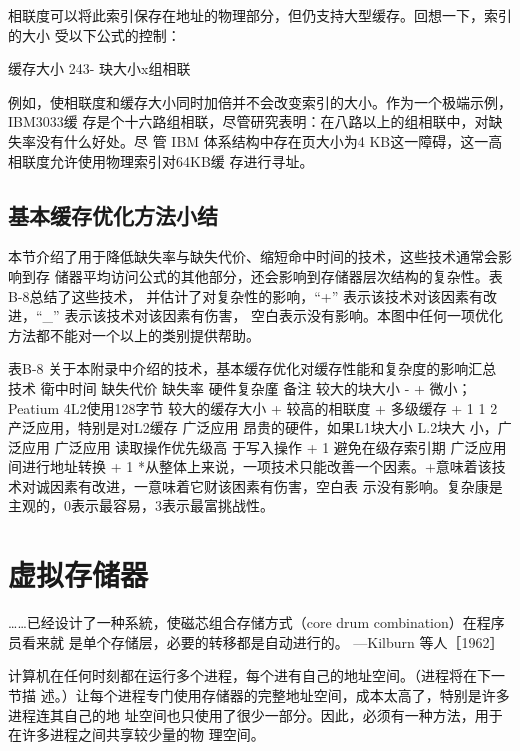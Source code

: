 相联度可以将此索引保存在地址的物理部分，但仍支持大型缓存。回想一下，索引的大小
受以下公式的控制：

缓存大小
243- 玦大小x组相联

例如，使相联度和缓存大小同时加倍并不会改变索引的大小。作为一个极端示例，IBM3033缓
存是个十六路组相联，尽管研究表明：在八路以上的组相联中，对缺失率没有什么好处。尽
管 IBM 体系结构中存在页大小为4 KB这一障碍，这一高相联度允许使用物理索引对64KB缓
存进行寻址。

\subsection{基本缓存优化方法小结}

本节介绍了用于降低缺失率与缺失代价、缩短命中时间的技术，这些技术通常会影响到存
储器平均访问公式的其他部分，还会影响到存储器层次结构的复杂性。表B-8总结了这些技术，
并估计了对复杂性的影响，“+” 表示该技术对该因素有改进，“\_” 表示该技术对该因素有伤害，
空白表示没有影响。本图中任何一项优化方法都不能对一个以上的类别提供帮助。

表B-8 关于本附录中介绍的技术，基本缓存优化对缓存性能和复杂度的影响汇总
技术
衛中时间
缺失代价
缺失率
硬件复杂廑
备注
较大的块大小
-
+
微小；Peatium 4L2使用128字节
较大的缓存大小
+
较高的相联度
+
多级缓存
+
1
1
2
产泛应用，特别是对L2缓存
广泛应用
昂贵的硬件，如果L1块大小 L.2块大
小，广泛应用
广泛应用
读取操作优先级高
于写入操作
+
1
避免在级存索引期
广泛应用
间进行地址转换
+
1
*从整体上来说，一项技术只能改善一个因素。+意味着该技术对诚因素有改进，一意味着它财该困素有伤害，空白表
示没有影响。复杂康是主观的，0表示最容易，3表示最富挑战性。

\section{虚拟存储器}
……已经设计了一种系統，使磁芯组合存储方式（core drum combination）在程序员看来就
是单个存储层，必要的转移都是自动进行的。
—Kilburn 等人［1962］

计算机在任何时刻都在运行多个进程，每个进有自己的地址空间。（进程将在下一节描
述。）让每个进程专门使用存储器的完整地址空间，成本太高了，特别是许多进程连其自己的地
址空间也只使用了很少一部分。因此，必须有一种方法，用于在许多进程之间共享较少量的物
理空间。

